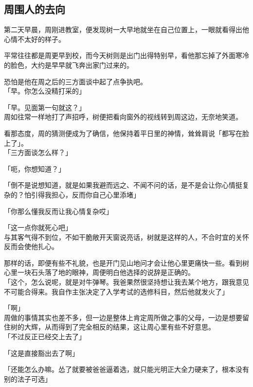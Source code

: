 \subsection{周围人的去向}

第二天早晨，周刚进教室，便发现树一大早地就坐在自己位置上，一眼就看得出他心情不太好的样子。

平常往往都是周更早到校，而今天树则是出门出得特别早，看他那忘掉了外面寒冷的脸色，大约是早早就飞奔出家门过来的。

恐怕是他在周之后的三方面谈中起了点争执吧。\\

「早。你怎么没精打采的」

「早。见面第一句就这？」\\

周如往常一样地打了声招呼，树便把看向窗外的视线转到周这边，无奈地笑道。

看那态度，周的猜测便成为了确信，他保持着平日里的神情，耸耸肩说「都写在脸上了」。\\

「三方面谈怎么样？」

「呃，你想知道？」

「倒不是说想知道，就是如果我避而远之、不闻不问的话，是不是会让你心情挺复杂的？怕引得我担心，反而你自己心里添堵」

「你那么懂我反而让我心情复杂哎」

「这一点你就死心吧」\\

与其客气得不到位，不如干脆敞开天窗说亮话，树就是这样的人，不合时宜的关怀反而会使他扎心。

那样的话，即便有些不礼貌，也是开门见山地问才会让他心里更痛快一些。看到树心里一块石头落了地的眼神，周便明白他选择的说辞是正确的。\\

「这个，怎么说呢，就是对牛弹琴。我爸果然很坚持想让我去某个地方，跟我意见不可能合得来。我自作主张决定了入学考试的选修科目，然后他就发火了」

「啊」\\

周做的事情其实也差不多，但一边是整体上肯定周所做之事的父母，一边是想要留住树的大辉，从而得到了完全相反的结果，这让周心里有些不好意思。\\

「不过反正已经交上去了」

「这是直接豁出去了啊」

「还能怎么办嘛。怂了就要被爸爸逼着选，就只能光明正大全力硬来了，根本没有别的法子可选」\\

